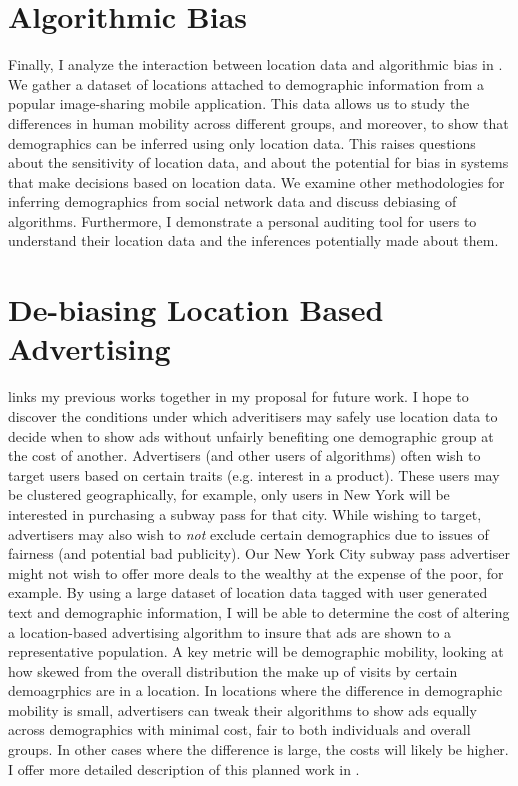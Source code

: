 \section{Algorithmic Bias}
Finally, I analyze the interaction between location data and algorithmic bias in .
We gather a dataset of locations attached to demographic information from a popular image-sharing mobile application.
This data allows us to study the differences in human mobility across different groups, and moreover, to show that demographics can be inferred using only location data.
This raises questions about the sensitivity of location data, and about the potential for bias in systems that make decisions based on location data.
We examine other methodologies for inferring demographics from social network data and discuss debiasing of algorithms.
Furthermore, I demonstrate a personal auditing tool for users to understand their location data and the inferences potentially made about them.

\section{De-biasing Location Based Advertising}
 links my previous works together in my proposal for future work.
I hope to discover the conditions under which adveritisers may safely use location data to decide when to show ads without unfairly benefiting one demographic group at the cost of another.
Advertisers (and other users of algorithms) often wish to target users based on certain traits (e.g. interest in a product).
These users may be clustered geographically, for example, only users in New York will be interested in purchasing a subway pass for that city.
While wishing to target, advertisers may also wish to \emph{not} exclude certain demographics due to issues of fairness (and potential bad publicity).
Our New York City subway pass advertiser might not wish to offer more deals to the wealthy at the expense of the poor, for example.
By using a large dataset of location data tagged with user generated text and demographic information, I will be able to determine the cost of altering a location-based advertising algorithm to insure that ads are shown to a representative population.
A key metric will be demographic mobility, looking at how skewed from the overall distribution the make up of visits by certain demoagrphics are in a location.
In locations where the difference in demographic mobility is small, advertisers can tweak their algorithms to show ads equally across demographics with minimal cost, fair to both individuals and overall groups.
In other cases where the difference is large, the costs will likely be higher.
I offer more detailed description of this planned work in .




